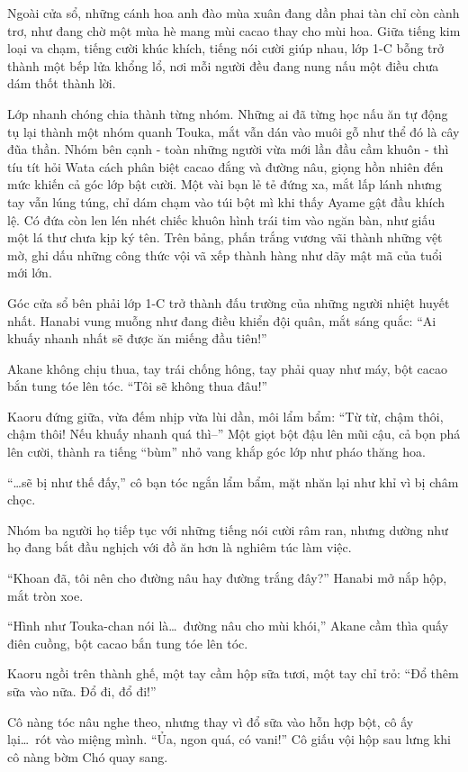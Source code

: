 \documentclass[../main.tex]{subfiles}
\begin{document}
Ngoài cửa sổ, những cánh hoa anh đào mùa xuân đang dần phai tàn chỉ còn cành trơ, như đang chờ một mùa hè mang mùi cacao thay cho mùi hoa. Giữa tiếng kim loại va chạm, tiếng cười khúc khích, tiếng nói cười giúp nhau, lớp 1-C bỗng trở thành một bếp lửa khổng lổ, nơi mỗi người đều đang nung nấu một điều chưa dám thốt thành lời.

Lớp nhanh chóng chia thành từng nhóm. Những ai đã từng học nấu ăn tự động tụ lại thành một nhóm quanh Touka, mắt vẫn dán vào muôi gỗ như thể đó là cây đũa thần. Nhóm bên cạnh - toàn những người vừa mới lần đầu cầm khuôn - thì tíu tít hỏi Wata cách phân biệt cacao đắng và đường nâu, giọng hồn nhiên đến mức khiến cả góc lớp bật cười. Một vài bạn lẻ tẻ đứng xa, mắt lấp lánh nhưng tay vẫn lúng túng, chỉ dám chạm vào túi bột mì khi thấy Ayame gật đầu khích lệ. Có đứa còn len lén nhét chiếc khuôn hình trái tim vào ngăn bàn, như giấu một lá thư chưa kịp ký tên. Trên bảng, phấn trắng vương vãi thành những vệt mờ, ghi dấu những công thức vội vã xếp thành hàng như dãy mật mã của tuổi mới lớn.

\ct

Góc cửa sổ bên phải lớp 1-C trở thành đấu trường của những người nhiệt huyết nhất. Hanabi vung muỗng như đang điều khiển đội quân, mắt sáng quắc: ``Ai khuấy nhanh nhất sẽ được ăn miếng đầu tiên!''

Akane không chịu thua, tay trái chống hông, tay phải quay như máy, bột cacao bắn tung tóe lên tóc. ``Tôi sẽ không thua đâu!''

Kaoru đứng giữa, vừa đếm nhịp vừa lùi dần, môi lẩm bẩm: ``Từ từ, chậm thôi, chậm thôi! Nếu khuấy nhanh quá thì--'' Một giọt bột đậu lên mũi cậu, cả bọn phá lên cười, thành ra tiếng ``bùm'' nhỏ vang khắp góc lớp như pháo thăng hoa.

``\dots sẽ bị như thế đấy,'' cô bạn tóc ngắn lẩm bẩm, mặt nhăn lại như khỉ vì bị châm chọc.

Nhóm ba người họ tiếp tục với những tiếng nói cười râm ran, nhưng dường như họ đang bắt đầu nghịch với đồ ăn hơn là nghiêm túc làm việc.

``Khoan đã, tôi nên cho đường nâu hay đường trắng đây?'' Hanabi mở nắp hộp, mắt tròn xoe.

``Hình như Touka-chan nói là\dots\ đường nâu cho mùi khói,'' Akane cầm thìa quấy điên cuồng, bột cacao bắn tung tóe lên tóc.

Kaoru ngồi trên thành ghế, một tay cầm hộp sữa tươi, một tay chỉ trỏ: ``Đổ thêm sữa vào nữa. Đổ đi, đổ đi!''

Cô nàng tóc nâu nghe theo, nhưng thay vì đổ sữa vào hỗn hợp bột, cô ấy lại\dots\ rót vào miệng mình. ``Ủa, ngon quá, có vani!'' Cô giấu vội hộp sau lưng khi cô nàng bờm Chó quay sang.
\end{document}
